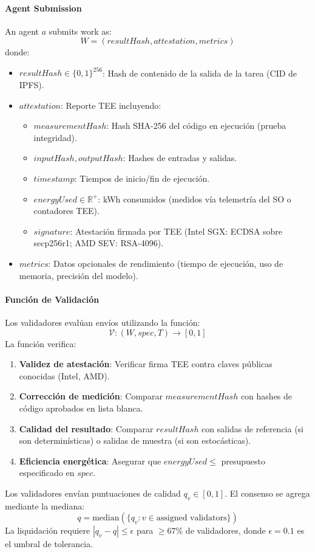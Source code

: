 \documentclass[11pt]{article}
\begin{document}
\paragraph{Agent Submission} An agent $a$ submits work as:
\begin{equation}
W = (resultHash, attestation, metrics)
\end{equation}
donde:
\begin{itemize}[noitemsep]
  \item $resultHash \in \{0,1\}^{256}$: Hash de contenido de la salida de la tarea (CID de IPFS).
  \item $attestation$: Reporte TEE incluyendo:
    \begin{itemize}[noitemsep]
      \item $measurementHash$: Hash SHA-256 del código en ejecución (prueba integridad).
      \item $inputHash, outputHash$: Hashes de entradas y salidas.
      \item $timestamp$: Tiempos de inicio/fin de ejecución.
      \item $energyUsed \in \mathbb{R}^+$: kWh consumidos (medidos vía telemetría del SO o contadores TEE).
      \item $signature$: Atestación firmada por TEE (Intel SGX: ECDSA sobre secp256r1; AMD SEV: RSA-4096).
    \end{itemize}
  \item $metrics$: Datos opcionales de rendimiento (tiempo de ejecución, uso de memoria, precisión del modelo).
\end{itemize}

\paragraph{Función de Validación} Los validadores evalúan envíos utilizando la función:
\begin{equation}
\mathcal{V}: (W, spec, T) \rightarrow [0, 1]
\end{equation}
La función verifica:
\begin{enumerate}[noitemsep]
  \item \textbf{Validez de atestación}: Verificar firma TEE contra claves públicas conocidas (Intel, AMD).
  \item \textbf{Corrección de medición}: Comparar $measurementHash$ con hashes de código aprobados en lista blanca.
  \item \textbf{Calidad del resultado}: Comparar $resultHash$ con salidas de referencia (si son determinísticas) o salidas de muestra (si son estocásticas).
  \item \textbf{Eficiencia energética}: Asegurar que $energyUsed \leq$ presupuesto especificado en $spec$.
\end{enumerate}
Los validadores envían puntuaciones de calidad $q_v \in [0,1]$. El consenso se agrega mediante la mediana:
\begin{equation}
q = \text{median}(\{q_v : v \in \text{assigned validators}\})
\end{equation}
La liquidación requiere $|q_v - q| \leq \epsilon$ para $\geq 67\%$ de validadores, donde $\epsilon = 0.1$ es el umbral de tolerancia.
\end{document}
